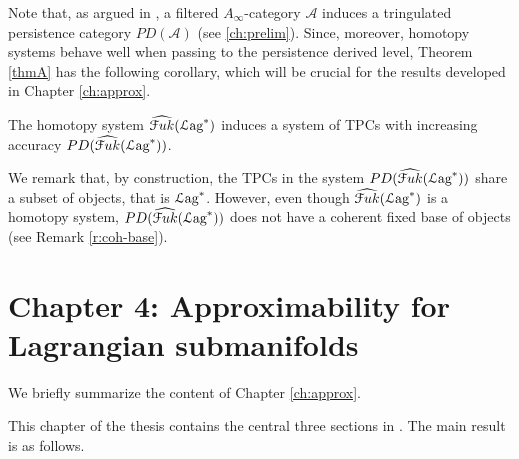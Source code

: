 
Note that, as argued in \cite{BCZ:tpc}, a filtered $A_\infty$-category $\mathcal{A}$ induces a tringulated persistence category $PD(\mathcal{A})$ (see \ref{ch:prelim}). Since, moreover, homotopy systems behave well when passing to the persistence derived level, Theorem \ref{thmA} has the following corollary, which will be crucial for the results developed in Chapter \ref{ch:approx}.
\begin{cor}
    The homotopy system $\widehat{\mathcal{F}uk}({\mathcal{L}\text{ag}}^*)$ induces a system of TPCs with increasing accuracy $PD(\widehat{\mathcal{F}uk}({\mathcal{L}\text{ag}}^*))$.
\end{cor}
We remark that, by construction, the TPCs in the system $PD(\widehat{\mathcal{F}uk}({\mathcal{L}\text{ag}}^*))$ share a subset of objects, that is ${\mathcal{L}\text{ag}}^*$. However, even though $\widehat{\mathcal{F}uk}({\mathcal{L}\text{ag}}^*)$ is a homotopy system, $PD(\widehat{\mathcal{F}uk}({\mathcal{L}\text{ag}}^*))$ does not have a coherent fixed base of objects (see Remark \ref{r:coh-base}).

\section{Chapter 4: Approximability for Lagrangian submanifolds}\label{intro:approx}
We briefly summarize the content of Chapter \ref{ch:approx}.

This chapter of the thesis contains the central three sections in \cite{ABC26}. The main result is as follows.

